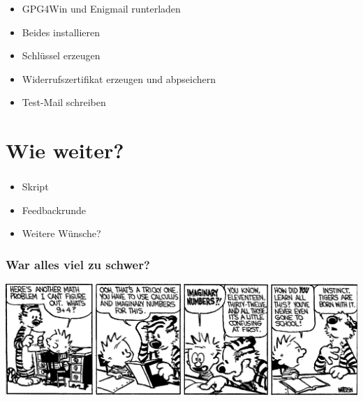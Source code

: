 \documentclass[compress]{beamer}
\begin{document}
\begin{frame}
  \frametitle{\insertsection}
  \begin{itemize}
  \item GPG4Win und Enigmail runterladen
  \item Beides installieren
  \item Schlüssel erzeugen
  \item Widerrufszertifikat erzeugen und abpseichern
  \item Test-Mail schreiben
  \end{itemize}
\end{frame}

\section{Wie weiter?}
\label{sec:weiter}

\begin{frame}
  \frametitle{\insertsection}
  \begin{itemize}
  \item Skript
  \item Feedbackrunde
  \item Weitere Wünsche?
  \end{itemize}
\end{frame}

\begin{frame}
  \frametitle{War alles viel zu schwer?}
  \includegraphics[width=1.05\columnwidth]{bilder/math4}
\end{frame}
\end{document}

